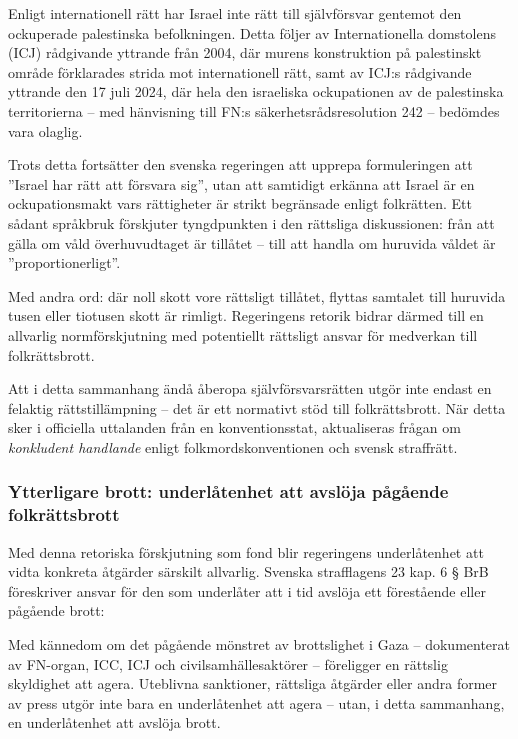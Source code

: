 Enligt internationell rätt har Israel inte rätt till självförsvar gentemot den ockuperade palestinska befolkningen. 
Detta följer av Internationella domstolens (ICJ) rådgivande yttrande från 2004, där murens konstruktion på palestinskt område 
förklarades strida mot internationell rätt, samt av ICJ:s rådgivande yttrande den 17 juli 2024, där hela den israeliska 
ockupationen av de palestinska territorierna – med hänvisning till FN:s säkerhetsrådsresolution 242 – bedömdes vara olaglig. 

Trots detta fortsätter den svenska regeringen att upprepa formuleringen att ”Israel har rätt att försvara sig”, 
utan att samtidigt erkänna att Israel är en ockupationsmakt vars rättigheter är strikt begränsade enligt folkrätten. 
Ett sådant språkbruk förskjuter tyngdpunkten i den rättsliga diskussionen: 
från att gälla om våld överhuvudtaget är tillåtet – till att handla om huruvida våldet är ”proportionerligt”.

Med andra ord: där noll skott vore rättsligt tillåtet, flyttas samtalet till huruvida tusen eller tiotusen skott är rimligt. 
Regeringens retorik bidrar därmed till en allvarlig normförskjutning med potentiellt rättsligt ansvar för medverkan 
till folkrättsbrott. 

Att i detta sammanhang ändå åberopa självförsvarsrätten utgör inte endast en felaktig rättstillämpning – det är ett 
normativt stöd till folkrättsbrott. 
När detta sker i officiella uttalanden från en konventionsstat, aktualiseras frågan om \textit{konkludent handlande} 
enligt folkmordskonventionen och svensk straffrätt.


\subsubsection{Ytterligare brott: underlåtenhet att avslöja pågående folkrättsbrott}

Med denna retoriska förskjutning som fond blir regeringens underlåtenhet att vidta konkreta åtgärder särskilt allvarlig. 
Svenska strafflagens 23 kap. 6 § BrB föreskriver ansvar för den som underlåter att i tid avslöja ett förestående eller pågående brott:


Med kännedom om det pågående mönstret av brottslighet i Gaza – dokumenterat av FN-organ, ICC, ICJ och civilsamhällesaktörer – 
föreligger en rättslig skyldighet att agera. Uteblivna sanktioner, rättsliga åtgärder eller andra former av press utgör inte 
bara en underlåtenhet att agera – utan, i detta sammanhang, en underlåtenhet att avslöja brott.

